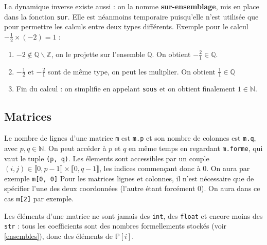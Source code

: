 \documentclass[french]{article}
\newcommand{\p}{\texttt} %
\begin{document}
La dynamique inverse existe aussi : on la nomme \textbf{sur-ensemblage}, mis en place dans la fonction \p{sur}. Elle est néanmoins temporaire puisqu'elle n'est utilisée que pour permettre les calculs entre deux types différents.
Exemple pour le calcul $-\frac{1}{2} \times (-2) = 1$ :
\begin{enumerate}
  \item $-2 \not\in \mathbb{Q} \backslash \mathbb{Z} $, on le projette sur l'ensemble $\mathbb{Q}$. On obtient $-\frac{2}{1} \in \mathbb{Q}$.
  \item $-\frac{1}{2}$ et $-\frac{2}{1}$ sont de même type, on peut les muliplier. On obtient $\frac{1}{1} \in \mathbb{Q}$
  \item Fin du calcul : on simplifie en appelant \p{sous} et on obtient finalement $1 \in \mathbb{N}$.
\end{enumerate}

\subsection{Matrices}

Le nombre de lignes d'une matrice \p{m} est \p{m.p} et son nombre de colonnes est \p{m.q}, avec $p, q \in \mathbb{N}$. On peut accéder à $p$ et $q$ en même temps en regardant \p{m.forme}, qui vaut le tuple \p{(p, q)}. Les élements sont accessibles par un couple $(i, j) \in \llbracket 0, p -1 \rrbracket \times \llbracket 0, q -1 \rrbracket$, les indices commençant donc à 0. On aura par exemple \p{m[0, 0]} Pour les matrices lignes et colonnes, il n'est nécessaire que de spécifier l'une des deux coordonnées (l'autre étant forcément 0). On aura dans ce cas \p{m[2]} par exemple.

Les éléments d'une matrice ne sont jamais des \p{int}, des \p{float} et encore moins des \p{str} : tous les coefficients sont des nombres formellements stockés (voir \ref{ensembles}), donc des éléments de $\mathbb{P}[i]$.
\end{document}
